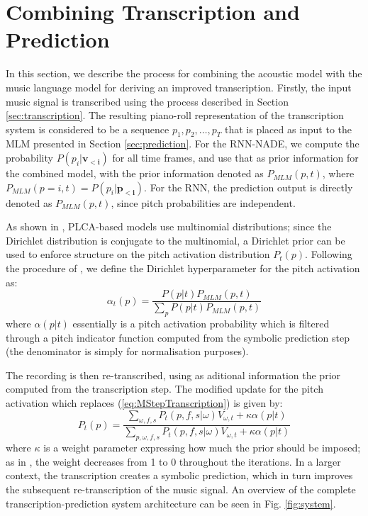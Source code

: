 \section{Combining Transcription and Prediction}
\label{sec:combination}


In this section, we describe the process for combining the acoustic model with the music language model for deriving an improved transcription. Firstly, the input music signal is transcribed using the process described in Section \ref{sec:transcription}. The resulting piano-roll representation of the transcription system is considered to be a sequence $p_1, p_2, \ldots, p_T$ that is placed as input to the MLM presented in Section \ref{sec:prediction}. For the RNN-NADE, we compute the probability $P(p_i|\mathbf{v_{<i}})$ for all time frames, and use that as prior information for the combined model, with the prior information  denoted as $P_{\mathit{MLM}}(p,t)$, where $P_{\mathit{MLM}}(p=i,t)=P(p_i|\mathbf{p_{<i}})$. For the RNN, the prediction output is directly denoted as $P_{\mathit{MLM}}(p,t)$, since pitch probabilities are independent.

As shown in \cite{Smaragdis2009}, PLCA-based models use multinomial distributions; since the Dirichlet distribution is conjugate to the multinomial, a Dirichlet prior can be used to enforce structure on the pitch activation distribution $P_{t}(p)$. Following the procedure of \cite{Smaragdis2009}, we define the Dirichlet hyperparameter for the pitch activation as:
\begin{equation}
 \alpha_{t}(p) = \frac{P(p|t)P_{\mathit{MLM}}(p,t)}{\sum_{p}P(p|t)P_{\mathit{MLM}}(p,t)}
\end{equation}
where $\alpha(p|t)$ essentially is a pitch activation probability which is filtered through a pitch indicator function computed from the symbolic prediction step (the denominator is simply for normalisation purposes).

The recording is then re-transcribed, using as aditional information the prior computed from the transcription step. The modified update for the pitch activation which replaces (\ref{eq:MStepTranscription}) is given by:
\begin{equation}
 P_{t}(p) = \frac{\sum_{\omega,f,s}P_{t}(p,f,s|\omega)V_{\omega,t}+\kappa\alpha(p|t)}{\sum_{p,\omega,f,s}P_{t}(p,f,s|\omega)V_{\omega,t}+\kappa\alpha(p|t)} \label{eq:modifiedMStepPitchActivation}
\end{equation}
where $\kappa$ is a weight parameter expressing how much the prior should be imposed; as in \cite{Smaragdis2009}, the weight decreases from 1 to 0 throughout the iterations. In a larger context, the transcription creates a symbolic prediction, which in turn improves the subsequent re-transcription of the music signal. An overview of the complete transcription-prediction system architecture can be seen in Fig. \ref{fig:system}.

